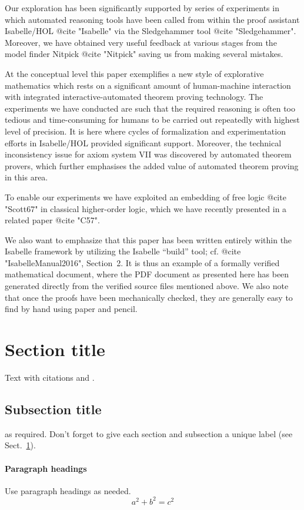 Our exploration has been significantly supported by series of experiments in which automated reasoning tools 
have been called from within the proof assistant Isabelle/HOL @{cite "Isabelle"} via the Sledgehammer 
tool @{cite "Sledgehammer"}. Moreover, we have obtained very useful feedback at various stages 
from the model finder Nitpick @{cite "Nitpick"} saving us from making several mistakes.

At the conceptual level this paper exemplifies a new style of explorative mathematics which rests 
on a significant amount of human-machine interaction with integrated interactive-auto\-ma\-ted 
theorem proving technology. The experiments we have conducted are such that the required 
reasoning is often too tedious and time-consuming for humans to be carried out repeatedly with 
highest level of precision. It is here where cycles of formalization and experimentation efforts in 
Isabelle/HOL provided  significant support. Moreover, the technical inconsistency issue for
axiom system VII was discovered by automated theorem provers, which further emphasises the added 
value of automated theorem proving in this area. 

To enable our experiments we have exploited an embedding of free logic @{cite "Scott67"} 
in classical higher-order logic, which we have recently presented in a related paper @{cite "C57"}.


We also want to emphasize that this paper has been written entirely within the Isabelle 
framework by utilizing the Isabelle ``build'' tool; cf. @{cite "IsabelleManual2016"}, Section~2. 
It is thus an example of a formally verified mathematical document, where the PDF document as 
presented here has been generated directly from the verified source files mentioned above.
We also note that once the proofs have been mechanically checked, they are generally easy 
to find by hand using paper and pencil.


\section{Section title}
\label{sec:1}
Text with citations \cite{RefB} and \cite{RefJ}.
\subsection{Subsection title}
\label{sec:2}
as required. Don't forget to give each section
and subsection a unique label (see Sect.~\ref{sec:1}).
\paragraph{Paragraph headings} Use paragraph headings as needed.
\begin{equation}
a^2+b^2=c^2
\end{equation}

